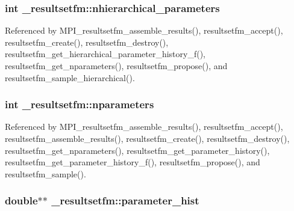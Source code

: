 \subsubsection[{\texorpdfstring{nhierarchical\+\_\+parameters}{nhierarchical_parameters}}]{\setlength{\rightskip}{0pt plus 5cm}int \+\_\+resultsetfm\+::nhierarchical\+\_\+parameters}\hypertarget{struct__resultsetfm_af0d9022e17ad4c2461ddc8f6c0cb3dea}{}\label{struct__resultsetfm_af0d9022e17ad4c2461ddc8f6c0cb3dea}


Referenced by M\+P\+I\+\_\+resultsetfm\+\_\+assemble\+\_\+results(), resultsetfm\+\_\+accept(), resultsetfm\+\_\+create(), resultsetfm\+\_\+destroy(), resultsetfm\+\_\+get\+\_\+hierarchical\+\_\+parameter\+\_\+history\+\_\+f(), resultsetfm\+\_\+get\+\_\+nparameters(), resultsetfm\+\_\+propose(), and resultsetfm\+\_\+sample\+\_\+hierarchical().

\subsubsection[{\texorpdfstring{nparameters}{nparameters}}]{\setlength{\rightskip}{0pt plus 5cm}int \+\_\+resultsetfm\+::nparameters}\hypertarget{struct__resultsetfm_a8a9ca679792870abea5db1dea416967e}{}\label{struct__resultsetfm_a8a9ca679792870abea5db1dea416967e}


Referenced by M\+P\+I\+\_\+resultsetfm\+\_\+assemble\+\_\+results(), resultsetfm\+\_\+accept(), resultsetfm\+\_\+assemble\+\_\+results(), resultsetfm\+\_\+create(), resultsetfm\+\_\+destroy(), resultsetfm\+\_\+get\+\_\+nparameters(), resultsetfm\+\_\+get\+\_\+parameter\+\_\+history(), resultsetfm\+\_\+get\+\_\+parameter\+\_\+history\+\_\+f(), resultsetfm\+\_\+propose(), and resultsetfm\+\_\+sample().

\subsubsection[{\texorpdfstring{parameter\+\_\+hist}{parameter_hist}}]{\setlength{\rightskip}{0pt plus 5cm}double$\ast$$\ast$ \+\_\+resultsetfm\+::parameter\+\_\+hist}\hypertarget{struct__resultsetfm_aedcaea6a6892921cfc97a91674cbda2d}{}\label{struct__resultsetfm_aedcaea6a6892921cfc97a91674cbda2d}


